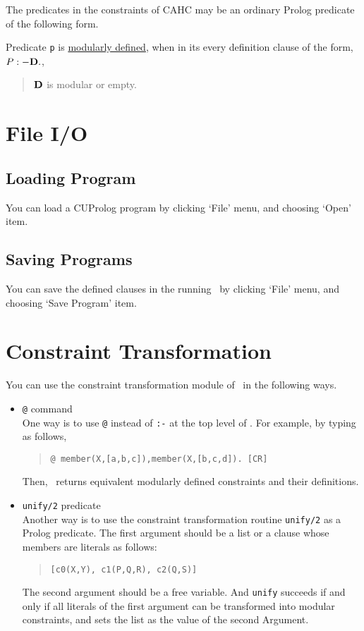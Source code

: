The predicates in the constraints of CAHC may be an ordinary Prolog
predicate of the following form.

\begin{defs} 
Predicate {\tt p} is \underline{modularly defined}, when in its every 
definition clause of the form, $P :-{\bf D}.$,
\begin{quote}
 ${\bf D}$ is modular or empty.
\end{quote}
\end{defs}


\section{File I/O}
\subsection{Loading Program}
  You can load a {\sf CUProlog} program by clicking `File' menu, and
choosing `Open' item.

\subsection{Saving Programs}
You can  save the defined clauses in the running \cuprolog\ by clicking
`File' menu, and choosing `Save Program' item.

\section{Constraint Transformation}
You can use the constraint transformation module of \cuprolog\
in the following ways.
\begin {itemize}
\item {{\tt @} command}\\
One way is to use {\tt @} instead of {\tt :-} at the top level of
\cuprolog. 
For example, by typing as follows,
\begin{quote}
	{\tt @ member(X,[a,b,c]),member(X,[b,c,d]). [CR]}
\end{quote}
Then, \cuprolog\  returns equivalent modularly defined constraints
and their definitions.

\item {{\tt unify/2} predicate}\\
Another way is to use the constraint transformation routine {\tt unify/2}
as a Prolog predicate.
The first argument should be a list or a clause whose members are literals
as follows:
\begin{quote}
	{\tt [c0(X,Y), c1(P,Q,R), c2(Q,S)] }
\end{quote}
The second argument should be a free variable.  And 
{\tt unify} succeeds if and only if all literals of the first argument
can be transformed into modular constraints, and sets the list as the
value of the second Argument. 
\end{itemize}

